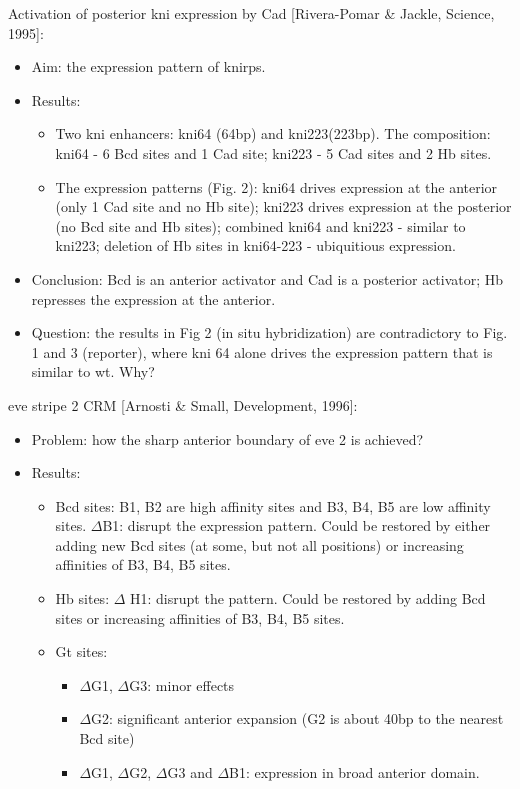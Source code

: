 \documentclass{report}
\begin{document}
\begin{enumerate}
	Activation of posterior kni expression by Cad [Rivera-Pomar \& Jackle, Science, 1995]:
	\begin{itemize}
		\item Aim: the expression pattern of knirps. 
		
		\item Results: 
		\begin{itemize}
			\item Two kni enhancers: kni64 (64bp) and kni223(223bp). The composition: kni64 - 6 Bcd sites and 1 Cad site; kni223 - 5 Cad sites and 2 Hb sites. 
			\item The expression patterns (Fig. 2): kni64 drives expression at the anterior (only 1 Cad site and no Hb site); kni223 drives expression at the posterior (no Bcd site and Hb sites); combined kni64 and kni223 - similar to kni223; deletion of Hb sites in kni64-223 - ubiquitious expression. 
		\end{itemize}
		
		\item Conclusion: Bcd is an anterior activator and Cad is a posterior activator; Hb represses the expression at the anterior. 
		
		\item Question: the results in Fig 2 (in situ hybridization) are contradictory to Fig. 1 and 3 (reporter), where kni 64 alone drives the expression pattern that is similar to wt. Why?
	\end{itemize}
	
	eve stripe 2 CRM [Arnosti \& Small, Development, 1996]:
	\begin{itemize}
		\item Problem: how the sharp anterior boundary of eve 2 is achieved? 
		
		\item Results:
		\begin{itemize}
			\item Bcd sites: B1, B2 are high affinity sites and B3, B4, B5 are low affinity sites. $\Delta$B1: disrupt the expression pattern. Could be restored by either adding new Bcd sites (at some, but not all positions) or increasing affinities of B3, B4, B5 sites. 
			\item Hb sites: $\Delta$ H1: disrupt the pattern. Could be restored by adding Bcd sites or increasing affinities of B3, B4, B5 sites. 
			\item Gt sites:
			\begin{itemize}
				\item $\Delta$G1, $\Delta$G3: minor effects
				\item $\Delta$G2: significant anterior expansion (G2 is about 40bp to the nearest Bcd site)
				\item $\Delta$G1, $\Delta$G2, $\Delta$G3 and $\Delta$B1: expression in broad anterior domain. 
			\end{itemize} 
		\end{itemize}
		

\end{itemize}
\end{enumerate}
\end{document}
